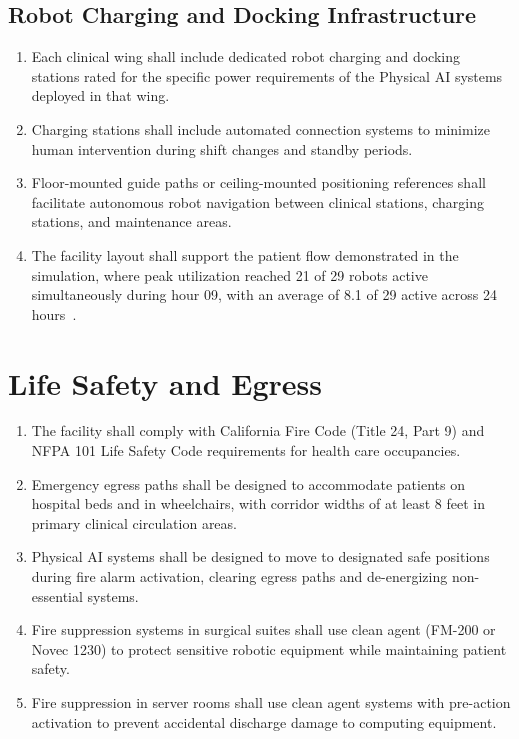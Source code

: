 \documentclass[11pt,letterpaper]{article}
\begin{document}
\subsection{Robot Charging and Docking Infrastructure}

\begin{enumerate}[label=(\alph*)]
\item Each clinical wing shall include dedicated robot charging and docking
  stations rated for the specific power requirements of the Physical AI
  systems deployed in that wing.

\item Charging stations shall include automated connection systems to minimize
  human intervention during shift changes and standby periods.

\item Floor-mounted guide paths or ceiling-mounted positioning references shall
  facilitate autonomous robot navigation between clinical stations, charging
  stations, and maintenance areas.

\item The facility layout shall support the patient flow demonstrated in the
  simulation, where peak utilization reached 21 of 29 robots active
  simultaneously during hour 09, with an average of 8.1 of 29 active across
  24 hours~\cite{newtrial2026}.
\end{enumerate}

\section{Life Safety and Egress}

\begin{enumerate}[label=(\alph*)]
\item The facility shall comply with California Fire Code (Title 24, Part 9)
  and NFPA 101 Life Safety Code requirements for health care occupancies.

\item Emergency egress paths shall be designed to accommodate patients on
  hospital beds and in wheelchairs, with corridor widths of at least 8 feet
  in primary clinical circulation areas.

\item Physical AI systems shall be designed to move to designated safe positions
  during fire alarm activation, clearing egress paths and de-energizing
  non-essential systems.

\item Fire suppression systems in surgical suites shall use clean agent (FM-200
  or Novec 1230) to protect sensitive robotic equipment while maintaining
  patient safety.

\item Fire suppression in server rooms shall use clean agent systems with
  pre-action activation to prevent accidental discharge damage to computing
  equipment.
\end{enumerate}

\printbibliography[title={References}]
\end{document}
